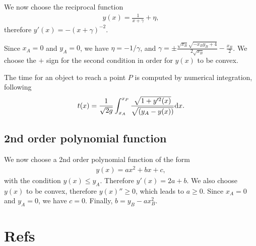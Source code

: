 \documentclass{article}
\begin{document}
We now choose the reciprocal function
\begin{align}
y(x) = \frac1{x+\gamma} + \eta,
\end{align}
therefore $y'(x) = -(x+\gamma)^{-2}$.

Since $x_A = 0$ and $y_A=0$, we have $\eta = -1/\gamma$, and $\displaystyle \gamma = \pm\frac{\sqrt{x_B} \sqrt{- x_B y_B + 4}}{2\sqrt{x_B}} - \frac{x_B}2$. We choose the $+$ sign for the second condition in order for $y(x)$ to be convex.

The time for an object to reach a point $P$ is computed by numerical integration, following
\begin{align}
t(x) &= \frac 1{\sqrt{2 g}} \int_{x_A}^{x_P} \frac{\sqrt{1 + y'^2(x)}}{\sqrt{(y_A - y(x))}} \text d x.\\
\label{eq:tAP_reciprocal}
\end{align}

\subsection*{2nd order polynomial function}

We now choose a 2nd order polynomial function of the form
\begin{align}
y(x) = a x^2 + b x + c,
\end{align}
with the condition $y(x) \leq y_A$. Therefore $y'(x) = 2a + b$. We also choose $y(x)$ to be convex, therefore $y(x)'' \geq 0$, which leads to $a \geq 0$. Since $x_A = 0$ and $y_A=0$, we have $c=0$. Finally, $b = y_B - a x_B^2$.




\section*{Refs}

\end{document}
